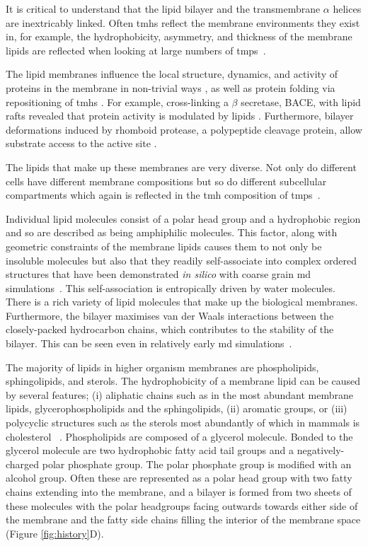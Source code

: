 It is critical to understand that the lipid bilayer and the transmembrane $\alpha$ helices are inextricably linked.
Often \gls{tmh}s reflect the membrane environments they exist in, for example, the hydrophobicity, asymmetry, and thickness of the membrane lipids are reflected when looking at large numbers of \gls{tmp}s~\cite{Sharpe2010}.

The lipid membranes influence the local structure, dynamics, and activity of proteins in the membrane in non-trivial ways \cite{White2001a, Jensen2004}, as well as protein folding via repositioning of \gls{tmh}s \cite{Kauko2010}.
For example, cross\--linking a $\beta$ secretase, BACE, with lipid rafts revealed that protein activity is modulated by lipids \cite{Kalvodova2005}.
Furthermore, bilayer deformations induced by rhomboid protease, a polypeptide cleavage protein, allow substrate access to the active site \cite{Bondar2009}.


The lipids that make up these membranes are very diverse.
Not only do different cells have different membrane compositions but so do different subcellular compartments which again is reflected in the \gls{tmh} composition of \gls{tmp}s~\cite{Sharpe2010, VanMeer2008}.

Individual lipid molecules consist of a polar head group and a hydrophobic region and so are described as being amphiphilic molecules.
This factor, along with geometric constraints of the membrane lipids causes them to not only be insoluble molecules but also that they readily self-associate into complex ordered structures that have been demonstrated \textit{in silico} with coarse grain \gls{md} simulations~\cite{Scott2008}.
This self\--association is entropically driven by water molecules.
There is a rich variety of lipid molecules that make up the biological membranes.
Furthermore, the bilayer maximises van der Waals interactions between the closely-packed hydrocarbon chains, which contributes to the stability of the bilayer.
This can be seen even in relatively early \gls{md} simulations~\cite{Goetz1998}.

The majority of lipids in higher organism membranes are phospholipids, sphingolipids, and sterols.
The hydrophobicity of a membrane lipid can be caused by several features; (i) aliphatic chains such as in the most abundant membrane lipids, glycerophospholipids and the sphingolipids, (ii) aromatic groups, or (iii) polycyclic structures such as the sterols most abundantly of which in mammals is cholesterol ~\cite{Helenius1975, Lichtenberg1983}.
Phospholipids are composed of a glycerol molecule.
Bonded to the glycerol molecule are two hydrophobic fatty acid tail groups and a negatively-charged polar phosphate group.
The polar phosphate group is modified with an alcohol group.
Often these are represented as a polar head group with two fatty chains extending into the membrane, and a bilayer is formed from two sheets of these molecules with the polar headgroups facing outwards towards either side of the membrane and the fatty side chains filling the interior of the membrane space (Figure \ref{fig:history}D).

